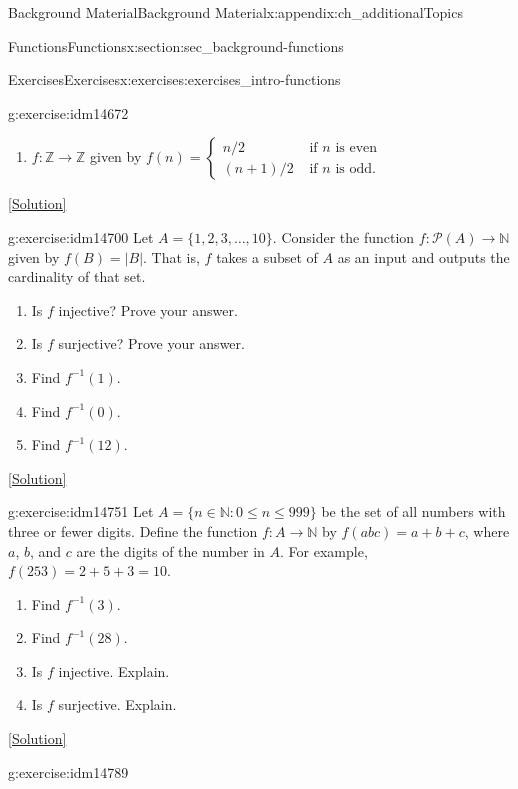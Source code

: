 \documentclass[oneside,10pt,]{book}
\numberwithin{equation}{chapter}
\def\N{\mathbb N}
\def\Z{\mathbb Z}
\def\pow{\mathcal P}
\def\inv{^{-1}}
\def\st{:}
\newcommand{\amp}{&}
\begin{document}
\begin{appendixptx}{Background Material}{}{Background Material}{}{}{x:appendix:ch_additionalTopics}
\begin{sectionptx}{Functions}{}{Functions}{}{}{x:section:sec_background-functions}
\begin{exercises-subsection}{Exercises}{}{Exercises}{}{}{x:exercises:exercises_intro-functions}
\begin{divisionexercise}{5}{}{}{g:exercise:idm14672}
\begin{enumerate}[label=(\alph*)]
\item{}\(f:\Z \to \Z\) given by \(f(n) = \begin{cases}n/2 \amp  \text{ if } n \text{ is even} \\ (n+1)/2 \amp \text{ if } n \text{ is odd} . \end{cases}\)%
\end{enumerate}
%
\space\hspace*{0pt}\hfill{\tiny\hyperlink{g:solution:idm14688-main}{[Solution]}}\end{divisionexercise}%
\begin{divisionexercise}{6}{}{}{g:exercise:idm14700}%
Let \(A = \{1,2,3,\ldots,10\}\). Consider the function \(f:\pow(A) \to \N\) given by \(f(B) = |B|\). That is, \(f\) takes a subset of \(A\) as an input and outputs the cardinality of that set.%
\begin{enumerate}[label=(\alph*)]
\item{}Is \(f\) injective? Prove your answer.%
\item{}Is \(f\) surjective? Prove your answer.%
\item{}Find \(f\inv(1)\).%
\item{}Find \(f\inv(0)\).%
\item{}Find \(f\inv(12)\).%
\end{enumerate}
%
\space\hspace*{0pt}\hfill{\tiny\hyperlink{g:solution:idm14724-main}{[Solution]}}\end{divisionexercise}%
\begin{divisionexercise}{7}{}{}{g:exercise:idm14751}%
Let \(A = \{n \in \N \st 0 \le n \le 999\}\) be the set of all numbers with three or fewer digits. Define the function \(f:A \to \N\) by \(f(abc) = a+b+c\), where \(a\), \(b\), and \(c\) are the digits of the number in \(A\). For example, \(f(253) = 2 + 5 + 3 =  10\).%
\begin{enumerate}[label=(\alph*)]
\item{}Find \(f\inv(3)\).%
\item{}Find \(f\inv(28)\).%
\item{}Is \(f\) injective. Explain.%
\item{}Is \(f\) surjective. Explain.%
\end{enumerate}
%
\space\hspace*{0pt}\hfill{\tiny\hyperlink{g:solution:idm14775-main}{[Solution]}}\end{divisionexercise}%
\begin{divisionexercise}{8}{}{}{g:exercise:idm14789}%

\end{divisionexercise}
\end{exercises-subsection}
\end{sectionptx}
\end{appendixptx}
\end{document}
